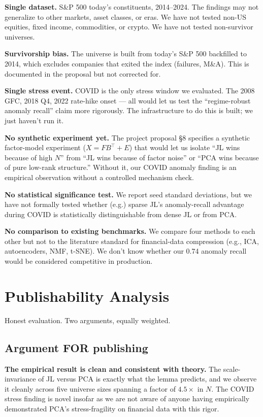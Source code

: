 \documentclass[11pt]{article}
\begin{document}
\textbf{Single dataset.} S\&P 500 today's constituents, 2014--2024. The findings may not generalize to other markets, asset classes, or eras. We have not tested non-US equities, fixed income, commodities, or crypto. We have not tested non-survivor universes.

\textbf{Survivorship bias.} The universe is built from today's S\&P 500 backfilled to 2014, which excludes companies that exited the index (failures, M\&A). This is documented in the proposal but not corrected for.

\textbf{Single stress event.} COVID is the only stress window we evaluated. The 2008 GFC, 2018 Q4, 2022 rate-hike onset --- all would let us test the ``regime-robust anomaly recall'' claim more rigorously. The infrastructure to do this is built; we just haven't run it.

\textbf{No synthetic experiment yet.} The project proposal §8 specifies a synthetic factor-model experiment ($X = F B^\top + E$) that would let us isolate ``JL wins because of high $N$'' from ``JL wins because of factor noise'' or ``PCA wins because of pure low-rank structure.'' Without it, our COVID anomaly finding is an empirical observation without a controlled mechanism check.

\textbf{No statistical significance test.} We report seed standard deviations, but we have not formally tested whether (e.g.) sparse JL's anomaly-recall advantage during COVID is statistically distinguishable from dense JL or from PCA.

\textbf{No comparison to existing benchmarks.} We compare four methods to each other but not to the literature standard for financial-data compression (e.g., ICA, autoencoders, NMF, t-SNE). We don't know whether our 0.74 anomaly recall would be considered competitive in production.

\newpage

\section{Publishability Analysis}

Honest evaluation. Two arguments, equally weighted.

\subsection{Argument FOR publishing}

\textbf{The empirical result is clean and consistent with theory.} The scale-invariance of JL versus PCA is exactly what the lemma predicts, and we observe it cleanly across five universe sizes spanning a factor of $4.5\times$ in $N$. The COVID stress finding is novel insofar as we are not aware of anyone having empirically demonstrated PCA's stress-fragility on financial data with this rigor.
\end{document}
